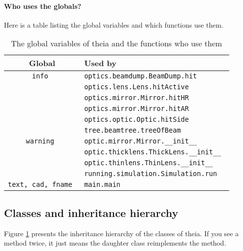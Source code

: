 \documentclass{article}
\begin{document}
\paragraph{Who uses the globals?}Here is a table listing the global variables and which functions use them.

\begin{table}[h]
\begin{center}

\begin{tabular}{|c | l |}
\hline
\textbf{Global} & \textbf{Used by} \\ \hline \hline

\tt{info} & \tt{optics.beamdump.BeamDump.hit} \\
& \tt{optics.lens.Lens.hitActive} \\
& \tt{optics.mirror.Mirror.hitHR} \\
& \tt{optics.mirror.Mirror.hitAR} \\
& \tt{optics.optic.Optic.hitSide} \\
& \tt{tree.beamtree.treeOfBeam} \\ \hline

\tt{warning} & \tt{optic.mirror.Mirror.\_\_init\_\_} \\
& \tt{optic.thicklens.ThickLens.\_\_init\_\_} \\
& \tt{optic.thinlens.ThinLens.\_\_init\_\_} \\
& \tt{running.simulation.Simulation.run} \\ \hline

\tt{text, cad, fname} & \tt{main.main} \\ \hline

\end{tabular}
\caption{The global variables of theia and the functions who use them}
\label{globals}
\end{center}
\end{table}
\subsection{Classes and inheritance hierarchy}
Figure \ref{inheritancehierarchy} presents the inheritance hierarchy of the classes of theia. If you see a method twice, it just means the daughter class reimplements the method.

\begin{figure}[h]
\begin{center}
\label{inheritancehierarchy}
\end{center}
\end{figure}
\end{document}
